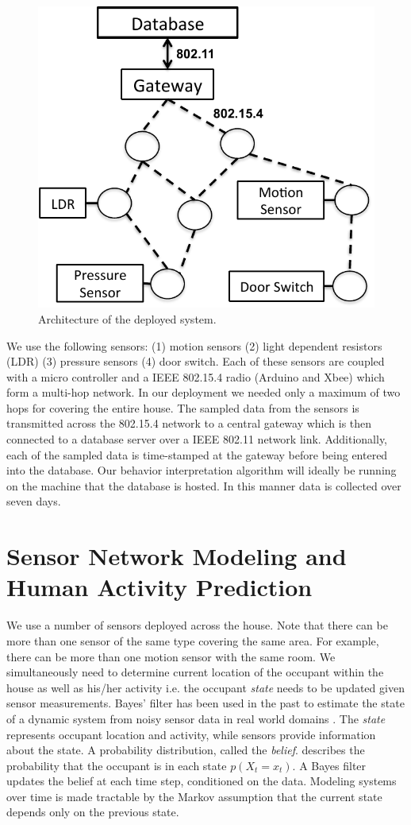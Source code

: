 \documentclass[10pt, conference, compsocconf]{IEEEtran}
\begin{document}
\begin{figure}
\begin{center}
\includegraphics[width=0.5\columnwidth]{figs/arch-crop}
\end{center}
\caption{Architecture of the deployed system.}
\label{fig:arch}
\end{figure}

We use the following sensors: (1) motion sensors (2) light dependent resistors (LDR) (3) pressure sensors (4) door switch. Each of these sensors are coupled with a micro controller and a IEEE 802.15.4 radio (Arduino and Xbee) which form a multi-hop network. In our deployment we needed only a maximum of two hops for covering the entire house. The sampled data from the sensors is transmitted across the 802.15.4 network to a central gateway which is then connected to a database server over a IEEE 802.11 network link. Additionally, each of the sampled data is time-stamped at the gateway before being entered into the database. Our behavior interpretation algorithm will ideally be running on the machine that the database is hosted. In this manner data is collected over seven days.  

\section{Sensor Network Modeling and Human Activity Prediction}
We use a number of sensors deployed across the house. Note that there can be more than one sensor of the same type covering the same area. For example, there can be more than one motion sensor with the same room. We simultaneously need to determine current location of the occupant within the house as well as his/her activity i.e. the occupant {\it state} needs to be updated given sensor measurements. Bayes' filter has been used in the past to estimate the state of a dynamic system from noisy sensor data in real world domains \cite{bayes}. The {\it state} represents occupant location and activity, while sensors provide information about the state. A probability distribution, called the {\it belief}. describes the probability that the occupant is in each state $p(X_t = x_t)$. A Bayes filter updates the belief at each time step, conditioned on the data. Modeling systems over time is made tractable by the Markov assumption that the current state depends only on the previous state.
\end{document}
